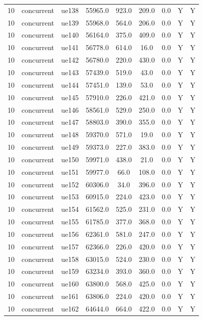 \begin{table}[ht]
\begin{tabular}{|c|c|c|c|c|c|c|c|c|}
10 & concurrent & ue138 & 55965.0 & 923.0 & 209.0 & 0.0 & Y & Y \\
10 & concurrent & ue139 & 55968.0 & 564.0 & 206.0 & 0.0 & Y & Y \\
10 & concurrent & ue140 & 56164.0 & 375.0 & 409.0 & 0.0 & Y & Y \\
10 & concurrent & ue141 & 56778.0 & 614.0 & 16.0 & 0.0 & Y & Y \\
10 & concurrent & ue142 & 56780.0 & 220.0 & 430.0 & 0.0 & Y & Y \\
10 & concurrent & ue143 & 57439.0 & 519.0 & 43.0 & 0.0 & Y & Y \\
10 & concurrent & ue144 & 57451.0 & 139.0 & 53.0 & 0.0 & Y & Y \\
10 & concurrent & ue145 & 57910.0 & 226.0 & 421.0 & 0.0 & Y & Y \\
10 & concurrent & ue146 & 58561.0 & 529.0 & 250.0 & 0.0 & Y & Y \\
10 & concurrent & ue147 & 58803.0 & 390.0 & 355.0 & 0.0 & Y & Y \\
10 & concurrent & ue148 & 59370.0 & 571.0 & 19.0 & 0.0 & Y & Y \\
10 & concurrent & ue149 & 59373.0 & 227.0 & 383.0 & 0.0 & Y & Y \\
10 & concurrent & ue150 & 59971.0 & 438.0 & 21.0 & 0.0 & Y & Y \\
10 & concurrent & ue151 & 59977.0 & 66.0 & 108.0 & 0.0 & Y & Y \\
10 & concurrent & ue152 & 60306.0 & 34.0 & 396.0 & 0.0 & Y & Y \\
10 & concurrent & ue153 & 60915.0 & 224.0 & 423.0 & 0.0 & Y & Y \\
10 & concurrent & ue154 & 61562.0 & 525.0 & 231.0 & 0.0 & Y & Y \\
10 & concurrent & ue155 & 61785.0 & 377.0 & 368.0 & 0.0 & Y & Y \\
10 & concurrent & ue156 & 62361.0 & 581.0 & 247.0 & 0.0 & Y & Y \\
10 & concurrent & ue157 & 62366.0 & 226.0 & 420.0 & 0.0 & Y & Y \\
10 & concurrent & ue158 & 63015.0 & 524.0 & 230.0 & 0.0 & Y & Y \\
10 & concurrent & ue159 & 63234.0 & 393.0 & 360.0 & 0.0 & Y & Y \\
10 & concurrent & ue160 & 63800.0 & 568.0 & 425.0 & 0.0 & Y & Y \\
10 & concurrent & ue161 & 63806.0 & 224.0 & 420.0 & 0.0 & Y & Y \\
10 & concurrent & ue162 & 64644.0 & 664.0 & 422.0 & 0.0 & Y & Y \\

\end{tabular}
\end{table}
